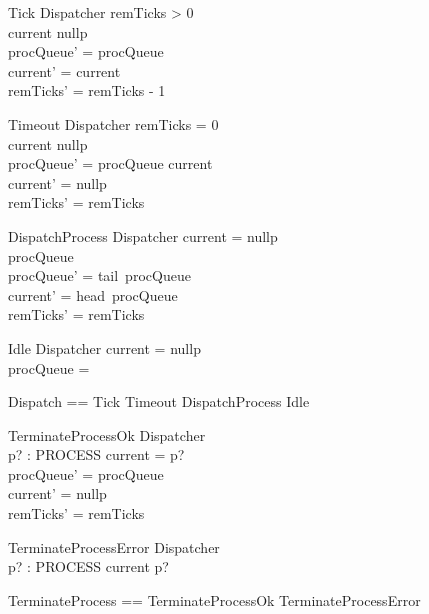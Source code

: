 \begin{schema}{Tick}
    \Delta Dispatcher
\where
    remTicks > 0 \\
    current \neq nullp \\
    procQueue' = procQueue \\
    current' = current \\
    remTicks' = remTicks - 1    
\end{schema}

\begin{schema}{Timeout}
    \Delta Dispatcher
\where
    remTicks = 0 \\
    current \neq nullp \\
    procQueue' = procQueue \cat \langle current \rangle \\
    current' = nullp \\
    remTicks' = remTicks 
\end{schema}

\begin{schema}{DispatchProcess}
    \Delta Dispatcher
\where
    current = nullp \\
    procQueue \neq \langle \rangle \\
    procQueue' = tail~procQueue \\
    current' = head~procQueue \\
    remTicks' = remTicks 
\end{schema}

\begin{schema}{Idle}
    \Xi Dispatcher
\where
    current = nullp \\
    procQueue = \langle \rangle
\end{schema}

\begin{zed}
    Dispatch == Tick \lor Timeout \lor DispatchProcess \lor Idle
\end{zed}

\begin{schema}{TerminateProcessOk}
    \Delta Dispatcher \\
    p? : PROCESS
\where
    current = p? \\
    procQueue' = procQueue \\
    current' = nullp \\
    remTicks' = remTicks
\end{schema}

\begin{schema}{TerminateProcessError}
    \Xi Dispatcher \\
    p? : PROCESS
\where
    current \neq p?
\end{schema}

\begin{zed}
    TerminateProcess == TerminateProcessOk \lor TerminateProcessError
\end{zed}

